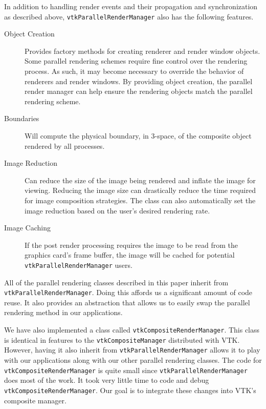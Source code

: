 \documentclass{acmsiggraph}
\newcommand{\cidentifier}[1]{\texttt{#1}}
\begin{document}
  In addition to handling render events and their propagation and
  synchronization as described above,
  \cidentifier{vtk\-Parallel\-Render\-Manager} also has the following
  features.
  \begin{description}
    \item [Object Creation] Provides factory methods for creating renderer
      and render window objects.  Some parallel rendering schemes require
      fine control over the rendering process.  As such, it may become
      necessary to override the behavior of renderers and render windows.
      By providing object creation, the parallel render manager can help
      ensure the rendering objects match the parallel rendering scheme.
    \item [Boundaries] Will compute the physical boundary, in 3-space, of
      the composite object rendered by all processes.
    \item [Image Reduction] Can reduce the size of the image being rendered
      and inflate the image for viewing.  Reducing the image size can
      drastically reduce the time required for image composition
      strategies.  The class can also automatically set the image reduction
      based on the user's desired rendering rate.
    \item [Image Caching] If the post render processing requires the image
      to be read from the graphics card's frame buffer, the image will be
      cached for potential \cidentifier{vtk\-Parallel\-Render\-Manager}
      users.
  \end{description}

  All of the parallel rendering classes described in this paper inherit
  from \cidentifier{vtk\-Parallel\-Render\-Manager}.  Doing this affords us
  a significant amount of code reuse.  It also provides an abstraction that
  allows us to easily swap the parallel rendering method in our
  applications.

  We have also implemented a class called
  \cidentifier{vtk\-Composite\-Render\-Manager}.  This class is identical
  in features to the \cidentifier{vtk\-Composite\-Manager} distributed with
  VTK.  However, having it also inherit from
  \cidentifier{vtk\-Parallel\-Render\-Manager} allows it to play with our
  applications along with our other parallel rendering classes.  The code
  for \cidentifier{vtk\-Composite\-Render\-Manager} is quite small since
  \cidentifier{vtk\-Parallel\-Render\-Manager} does most of the work.  It
  took very little time to code and debug
  \cidentifier{vtk\-Composite\-Render\-Manager}.  Our goal is to integrate
  these changes into VTK's composite manager.
\end{document}
